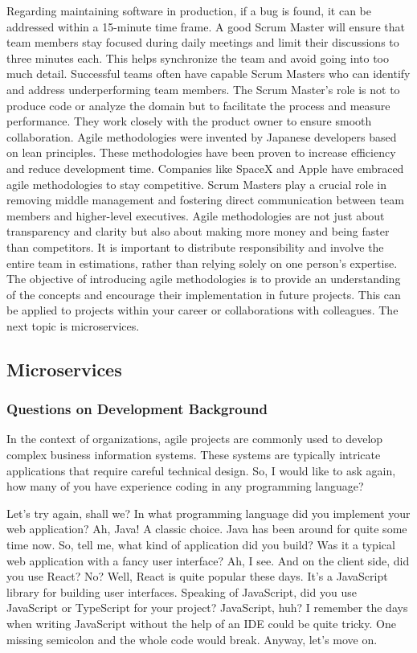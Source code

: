 Regarding maintaining software in production, if a bug is found, it can
be addressed within a 15-minute time frame. A good Scrum Master will
ensure that team members stay focused during daily meetings and limit
their discussions to three minutes each. This helps synchronize the team
and avoid going into too much detail. Successful teams often have
capable Scrum Masters who can identify and address underperforming team
members. The Scrum Master's role is not to produce code or analyze the
domain but to facilitate the process and measure performance. They work
closely with the product owner to ensure smooth collaboration. Agile
methodologies were invented by Japanese developers based on lean
principles. These methodologies have been proven to increase efficiency
and reduce development time. Companies like SpaceX and Apple have
embraced agile methodologies to stay competitive. Scrum Masters play a
crucial role in removing middle management and fostering direct
communication between team members and higher-level executives. Agile
methodologies are not just about transparency and clarity but also about
making more money and being faster than competitors. It is important to
distribute responsibility and involve the entire team in estimations,
rather than relying solely on one person's expertise. The objective of
introducing agile methodologies is to provide an understanding of the
concepts and encourage their implementation in future projects. This can
be applied to projects within your career or collaborations with
colleagues. The next topic is microservices.


\subsection{Microservices}

\subsubsection{Questions on Development Background}

In the context of organizations, agile projects are commonly used to
develop complex business information systems. These systems are
typically intricate applications that require careful technical design.
So, I would like to ask again, how many of you have experience coding in
any programming language?

Let's try again, shall we? In what programming language did you
implement your web application? Ah, Java! A classic choice. Java has
been around for quite some time now. So, tell me, what kind of
application did you build? Was it a typical web application with a fancy
user interface? Ah, I see. And on the client side, did you use React?
No? Well, React is quite popular these days. It's a JavaScript library
for building user interfaces. Speaking of JavaScript, did you use
JavaScript or TypeScript for your project? JavaScript, huh? I remember
the days when writing JavaScript without the help of an IDE could be
quite tricky. One missing semicolon and the whole code would break.
Anyway, let's move on.

